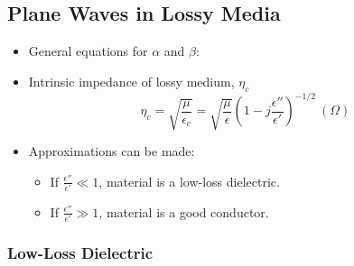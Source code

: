 \documentclass[a4paper]{article}
\begin{document}
\subsection{Plane Waves in Lossy Media}
\begin{itemize}
    \item General equations for $\alpha$ and $\beta$:
    \begin{center}
    \end{center}
    \item Intrinsic impedance of lossy medium, $\eta_c$
    $$\eta_c = \sqrt{\frac{\mu}{\epsilon_c}} = \sqrt{\frac{\mu}{\epsilon}}\left(1-j\frac{\epsilon''}{\epsilon'}\right)^{-1/2}\ (\Omega)$$
    \item Approximations can be made:
    \begin{itemize}[label=$\circ$]
        \item If $\displaystyle\frac{\epsilon''}{\epsilon'} \ll 1$, material is a low-loss dielectric.
        \item If $\displaystyle\frac{\epsilon''}{\epsilon'} \gg 1$, material is a good conductor.
    \end{itemize}
\end{itemize}

\subsubsection{Low-Loss Dielectric}
\begin{center}
\end{center}
\end{document}
